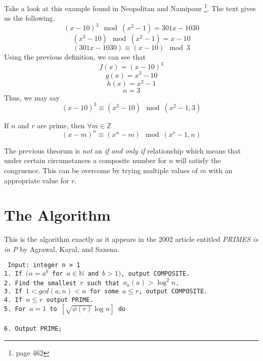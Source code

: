 \documentclass[11pt]{article}
\begin{document}
Take a look at this example found in Neopolitan and Namipour \footnote{page 462}. The text gives us the following.
$$(x-10)^3 \mod (x^2-1) = 301x-1030 $$
$$(x^3-10) \mod (x^2-1) = x-10$$
$$(301x-1030) \equiv (x-10) \mod 3$$
Using the previous definition, we can see that
$$f(x) = (x-10)^3$$
$$g(x) = x^3-10$$
$$h(x) = x^2-1$$
$$n=3$$
Thus, we may say
$$(x-10)^3 \equiv (x^3-10) \mod (x^2-1,3)$$
\begin{thm}{If $n$ and $r$ are prime, then $\forall{m\in{\mathbb{Z}}}$}
\begin{equation}
(x-m)^n \equiv (x^n -m) \mod (x^r-1,n)
\end{equation}
\end{thm}
The previous theorum is \emph{not} an \emph{if and only if} relationship which means that under certain circumstances a composite number for $n$ will satisfy the congruence. This can be overcome by trying multiple values of $m$ with an appropriate value for $r$.

\section{The Algorithm}
This is the algorithm exactly as it appears in the 2002 article entitled \emph{PRIMES is in P} by Agrawal, Kayal, and Saxena. \vspace{2pc}

\texttt{
Input: integer n > 1 \\
1. If $(n=a^b$ for $a\in{\mathbb{N}}$ and  $b>1)$, output COMPOSITE. \\
2. Find the smallest $r$ such that 	$o_n(a)>\log^2n$. \\
3. If $1<gcd(a,n)<n$ for some $a\le{r}$, output COMPOSITE. \\
4. If $n \le{r}$ output PRIME. \\
5. For $a=1$ to $[\sqrt{\phi(r)}\log{n}]$ do \\
 \\
6. Output PRIME;
}
\end{document}
